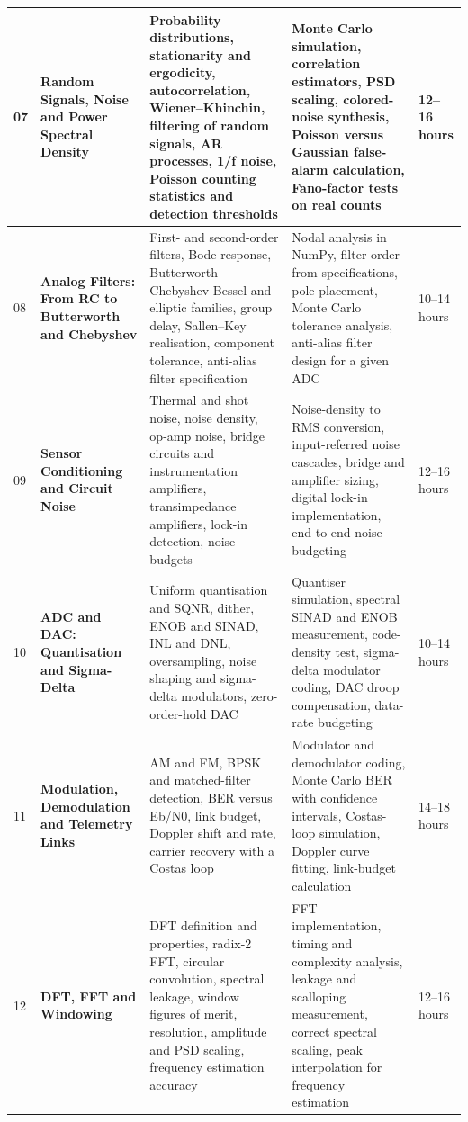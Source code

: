 \documentclass[11pt,a4paper,landscape]{article}
\begin{document}
{\begin{longtable}{@{}p{0.6cm}p{3.7cm}p{8.2cm}p{7.6cm}p{2.0cm}@{}}
07 & \textbf{Random Signals, Noise and Power Spectral Density} & Probability distributions, stationarity and ergodicity, autocorrelation, Wiener--Khinchin, filtering of random signals, AR processes, 1/f noise, Poisson counting statistics and detection thresholds & Monte Carlo simulation, correlation estimators, PSD scaling, colored-noise synthesis, Poisson versus Gaussian false-alarm calculation, Fano-factor tests on real counts & 12--16 hours\\\midrule
08 & \textbf{Analog Filters: From RC to Butterworth and Chebyshev} & First- and second-order filters, Bode response, Butterworth Chebyshev Bessel and elliptic families, group delay, Sallen--Key realisation, component tolerance, anti-alias filter specification & Nodal analysis in NumPy, filter order from specifications, pole placement, Monte Carlo tolerance analysis, anti-alias filter design for a given ADC & 10--14 hours\\\midrule
09 & \textbf{Sensor Conditioning and Circuit Noise} & Thermal and shot noise, noise density, op-amp noise, bridge circuits and instrumentation amplifiers, transimpedance amplifiers, lock-in detection, noise budgets & Noise-density to RMS conversion, input-referred noise cascades, bridge and amplifier sizing, digital lock-in implementation, end-to-end noise budgeting & 12--16 hours\\\midrule
10 & \textbf{ADC and DAC: Quantisation and Sigma-Delta} & Uniform quantisation and SQNR, dither, ENOB and SINAD, INL and DNL, oversampling, noise shaping and sigma-delta modulators, zero-order-hold DAC & Quantiser simulation, spectral SINAD and ENOB measurement, code-density test, sigma-delta modulator coding, DAC droop compensation, data-rate budgeting & 10--14 hours\\\midrule
11 & \textbf{Modulation, Demodulation and Telemetry Links} & AM and FM, BPSK and matched-filter detection, BER versus Eb/N0, link budget, Doppler shift and rate, carrier recovery with a Costas loop & Modulator and demodulator coding, Monte Carlo BER with confidence intervals, Costas-loop simulation, Doppler curve fitting, link-budget calculation & 14--18 hours\\\midrule
12 & \textbf{DFT, FFT and Windowing} & DFT definition and properties, radix-2 FFT, circular convolution, spectral leakage, window figures of merit, resolution, amplitude and PSD scaling, frequency estimation accuracy & FFT implementation, timing and complexity analysis, leakage and scalloping measurement, correct spectral scaling, peak interpolation for frequency estimation & 12--16 hours\\\midrule

\end{longtable}}
\end{document}
